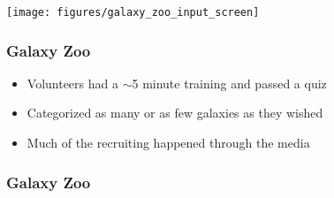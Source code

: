 \documentclass[aspectratio=169]{beamer}
\begin{document}
\begin{frame}
\frametitle{}

\begin{center}
\texttt{[image: figures/galaxy\_zoo\_input\_screen]}
\end{center}

\end{frame}
\begin{frame}
\frametitle{Galaxy Zoo}

\begin{itemize}
\item Volunteers had a $\sim$5 minute training and passed a quiz
\item Categorized as many or as few galaxies as they wished
\item Much of the recruiting happened through the media
\end{itemize}

\end{frame}
\begin{frame}
\frametitle{Galaxy Zoo}

\setcounter{subfigure}{0}
\begin{figure}
  \centering
  \hspace{0.05\textwidth}
\end{figure}

\end{frame}
\end{document}
